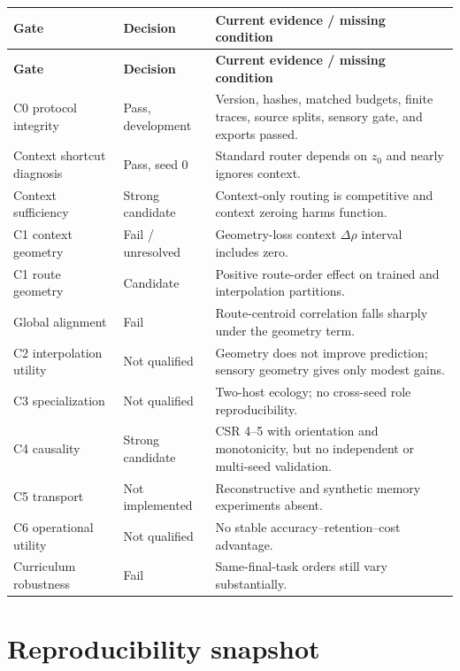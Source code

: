 \documentclass[11pt,a4paper]{article}
\begin{document}
\begin{longtable}{p{3.7cm}p{2.5cm}p{7.8cm}}
\toprule
\textbf{Gate} & \textbf{Decision} & \textbf{Current evidence / missing condition}\\
\midrule
\endfirsthead
\toprule
\textbf{Gate} & \textbf{Decision} & \textbf{Current evidence / missing condition}\\
\midrule
\endhead
C0 protocol integrity & Pass, development & Version, hashes, matched budgets, finite traces, source splits, sensory gate, and exports passed.\\
Context shortcut diagnosis & Pass, seed 0 & Standard router depends on $z_0$ and nearly ignores context.\\
Context sufficiency & Strong candidate & Context-only routing is competitive and context zeroing harms function.\\
C1 context geometry & Fail / unresolved & Geometry-loss context $\Delta\rho$ interval includes zero.\\
C1 route geometry & Candidate & Positive route-order effect on trained and interpolation partitions.\\
Global alignment & Fail & Route-centroid correlation falls sharply under the geometry term.\\
C2 interpolation utility & Not qualified & Geometry does not improve prediction; sensory geometry gives only modest gains.\\
C3 specialization & Not qualified & Two-host ecology; no cross-seed role reproducibility.\\
C4 causality & Strong candidate & CSR 4--5 with orientation and monotonicity, but no independent or multi-seed validation.\\
C5 transport & Not implemented & Reconstructive and synthetic memory experiments absent.\\
C6 operational utility & Not qualified & No stable accuracy--retention--cost advantage.\\
Curriculum robustness & Fail & Same-final-task orders still vary substantially.\\
\bottomrule
\end{longtable}

\section{Reproducibility snapshot}
\end{document}
